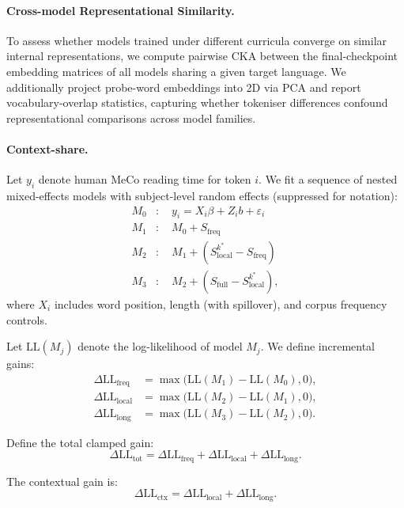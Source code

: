 \paragraph{Cross-model Representational Similarity.}
To assess whether models trained under different curricula converge on similar internal representations, we compute pairwise CKA between the final-checkpoint embedding matrices of all models sharing a given target language. We additionally project probe-word embeddings into 2D via PCA and report vocabulary-overlap statistics, capturing whether tokeniser differences confound representational comparisons across model families.


\paragraph{Context-share.}
Let $y_i$ denote human MeCo reading time for token $i$. We fit a sequence of nested mixed-effects models with subject-level random effects (suppressed for notation):
\begin{align*}
M_0 &: \quad y_i = X_i \beta + Z_i b + \varepsilon_i \\
M_1 &: \quad M_0 + S_{\text{freq}} \\
M_2 &: \quad M_1 + \left(S_{\text{local}}^{k^*} - S_{\text{freq}}\right) \\
M_3 &: \quad M_2 + \left(S_{\text{full}} - S_{\text{local}}^{k^*}\right),
\end{align*}
where $X_i$ includes word position, length (with spillover), and corpus frequency controls.

Let $\mathrm{LL}(M_j)$ denote the log-likelihood of model $M_j$. We define incremental gains:
\begin{align*}
\Delta \mathrm{LL}_{\text{freq}} &= \max\big(\mathrm{LL}(M_1)-\mathrm{LL}(M_0), 0\big), \\
\Delta \mathrm{LL}_{\text{local}} &= \max\big(\mathrm{LL}(M_2)-\mathrm{LL}(M_1), 0\big), \\
\Delta \mathrm{LL}_{\text{long}} &= \max\big(\mathrm{LL}(M_3)-\mathrm{LL}(M_2), 0\big).
\end{align*}

Define the total clamped gain:
\[
\Delta \mathrm{LL}_{\text{tot}} =
\Delta \mathrm{LL}_{\text{freq}} +
\Delta \mathrm{LL}_{\text{local}} +
\Delta \mathrm{LL}_{\text{long}}.
\]

The contextual gain is:
\[
\Delta \mathrm{LL}_{\text{ctx}} =
\Delta \mathrm{LL}_{\text{local}} + \Delta \mathrm{LL}_{\text{long}}.
\]

